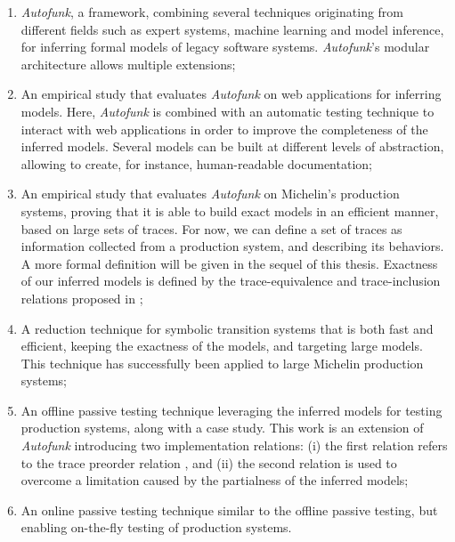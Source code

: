 \begin{enumerate}
    \item \textit{Autofunk}, a framework, combining several
        techniques originating from different fields such as
        expert systems, machine learning and model inference, for
        inferring formal models of legacy software systems.
        \textit{Autofunk}'s modular architecture allows multiple
        extensions;

    \item An empirical study that evaluates \textit{Autofunk} on
        web applications for inferring models. Here,
        \textit{Autofunk} is combined with an automatic testing
        technique to interact with web applications in order to
        improve the completeness of the inferred models. Several
        models can be built at different levels of abstraction,
        allowing to create, for instance, human-readable
        documentation;

    \item An empirical study that evaluates \textit{Autofunk} on
        Michelin's production systems, proving that it is able to
        build exact models in an efficient manner, based on large
        sets of traces. For now, we can define a set of traces as
        information collected from a production system, and
        describing its behaviors. A more formal definition will
        be given in the sequel of this thesis. Exactness of our
        inferred models is defined by the trace-equivalence and
        trace-inclusion relations proposed in \cite{petrenko06};

    \item A reduction technique for symbolic transition systems
        that is both fast and efficient, keeping the exactness of
        the models, and targeting large models. This technique
        has successfully been applied to large Michelin
        production systems;

    \item An offline passive testing technique leveraging the
        inferred models for testing production systems, along
        with a case study. This work is an extension of
        \textit{Autofunk} introducing two implementation
        relations: (i) the first relation refers to the trace
        preorder relation \cite{DNH84}, and (ii) the second
        relation is used to overcome a limitation caused by the
        partialness of the inferred models;

    \item An online passive testing technique similar to the
        offline passive testing, but enabling on-the-fly testing
        of production systems.
\end{enumerate}

